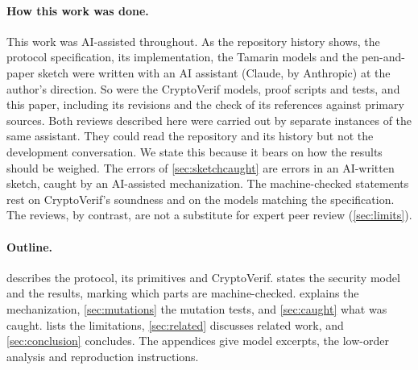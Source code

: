 \paragraph{How this work was done.}
This work was AI-assisted throughout. As the repository history shows, the
protocol specification, its implementation, the Tamarin models and the
pen-and-paper sketch were written with an AI assistant (Claude, by
Anthropic) at the author's direction. So were the CryptoVerif models, proof
scripts and tests, and this paper, including its revisions and the check of
its references against primary sources. Both reviews described here were
carried out by separate instances of the same assistant. They could
read the repository and its history but not the development conversation.
We state this because it bears on how the results should be weighed. The
errors of \cref{sec:sketchcaught} are errors in an AI-written sketch, caught
by an AI-assisted mechanization. The machine-checked statements rest on
CryptoVerif's soundness and on the models matching the specification. The
reviews, by contrast, are not a substitute for expert peer review
(\cref{sec:limits}).

\paragraph{Outline.}
 describes the protocol, its primitives and
CryptoVerif.  states the security model and the results,
marking which parts are machine-checked.  explains the
mechanization, \cref{sec:mutations} the mutation tests, and
\cref{sec:caught} what was caught.  lists the limitations,
\cref{sec:related} discusses related work, and \cref{sec:conclusion}
concludes. The appendices give model excerpts, the low-order analysis and
reproduction instructions.
